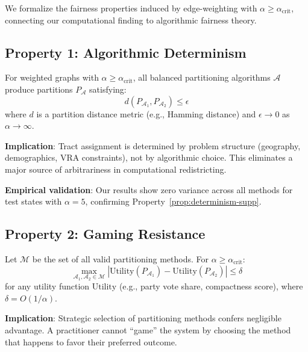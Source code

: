 
We formalize the fairness properties induced by edge-weighting with $\alpha \geq \alpha_{\text{crit}}$, connecting our computational finding to algorithmic fairness theory.

\subsection{Property 1: Algorithmic Determinism}

\begin{property}
\label{prop:determinism-supp}
For weighted graphs with $\alpha \geq \alpha_{\text{crit}}$, all balanced partitioning algorithms $\mathcal{A}$ produce partitions $P_{\mathcal{A}}$ satisfying:
\[
d(P_{\mathcal{A}_1}, P_{\mathcal{A}_2}) \leq \epsilon
\]
where $d$ is a partition distance metric (e.g., Hamming distance) and $\epsilon \to 0$ as $\alpha \to \infty$.
\end{property}

\textbf{Implication}: Tract assignment is determined by problem structure (geography, demographics, VRA constraints), not by algorithmic choice. This eliminates a major source of arbitrariness in computational redistricting.

\textbf{Empirical validation}: Our results show zero variance across all methods for test states with $\alpha = 5$, confirming Property~\ref{prop:determinism-supp}.

\subsection{Property 2: Gaming Resistance}

\begin{property}
\label{prop:gaming-supp}
Let $\mathcal{M}$ be the set of all valid partitioning methods. For $\alpha \geq \alpha_{\text{crit}}$:
\[
\max_{\mathcal{A}_1, \mathcal{A}_2 \in \mathcal{M}} \left| \text{Utility}(P_{\mathcal{A}_1}) - \text{Utility}(P_{\mathcal{A}_2}) \right| \leq \delta
\]
for any utility function $\text{Utility}$ (e.g., party vote share, compactness score), where $\delta = O(1/\alpha)$.
\end{property}

\textbf{Implication}: Strategic selection of partitioning methods confers negligible advantage. A practitioner cannot ``game'' the system by choosing the method that happens to favor their preferred outcome.

